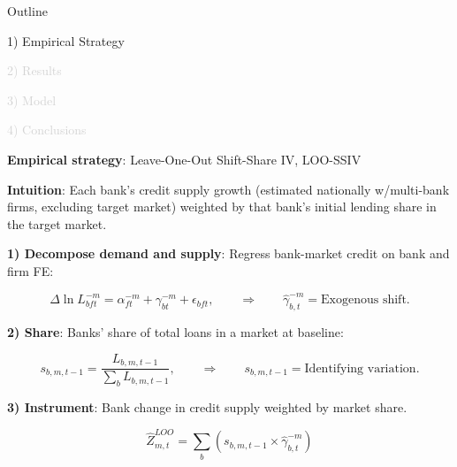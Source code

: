 \documentclass[aspectratio=169]{beamer}
\begin{document}
\begin{frame}[noframenumbering]{Outline}

\Large

1) Empirical Strategy

\vspace{5mm}

\textcolor{lightgray}{2) Results}

\vspace{5mm}

\textcolor{lightgray}{3) Model}

\vspace{5mm}

\textcolor{lightgray}{4) Conclusions}


\end{frame}


\begin{frame}{\textbf{Empirical strategy}: Leave-One-Out Shift-Share IV, LOO-SSIV} \label{iv_market_level}

\textbf{Intuition}: Each bank's credit supply growth (estimated nationally w/multi-bank firms, excluding target market) weighted by that bank's initial lending share in the target market.

\vspace{5mm}
\pause

\textbf{1) Decompose demand and supply}: Regress bank-market credit on bank and firm FE:

\begin{equation*}
     \Delta \ln L_{bft}^{-m} = \alpha_{ft}^{-m} + \gamma_{bt}^{-m} + \epsilon_{bft}, \quad \quad \Rightarrow \quad \quad \hat{\gamma}_{b,t}^{-m} = \text{Exogenous shift.} 
\end{equation*}
\pause

\textbf{2) Share}: Banks' share of total loans in a market at baseline:

\begin{equation*}
    s_{b,m,t-1} = \frac{L_{b,m,t-1}}{\sum_b L_{b,m,t-1}}, \quad \quad \Rightarrow \quad \quad s_{b,m,t-1} = \text{Identifying variation.} 
\end{equation*}
\pause

\textbf{3) Instrument}: Bank change in credit supply weighted by market share.  

\begin{equation*}
    \hat{Z}_{m,t}^{LOO} = \sum_b \left( s_{b,m,t-1} \times \hat{\gamma}_{b,t}^{-m} \right) 
\end{equation*}


\end{frame}
\end{document}
